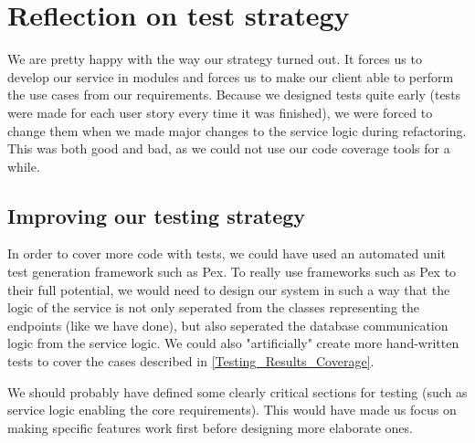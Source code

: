 \section{Reflection on test strategy}
\label{Testing_Reflection}
We are pretty happy with the way our strategy turned out. It forces us to develop our service in modules and forces us to make our client able to perform the use cases from our requirements. Because we designed tests quite early (tests were made for each user story every time it was finished), we were forced to change them when we made major changes to the service logic during refactoring. This was both good and bad, as we could not use our code coverage tools for a while.
\subsection{Improving our testing strategy}
\label{Testing_Reflection_improvements}
In order to cover more code with tests, we could have used an automated unit test generation framework such as Pex\cite{PEX}. To really use frameworks such as Pex to their full potential, we would need to design our system in such a way that the logic of the service is not only seperated from the classes representing the endpoints (like we have done), but also seperated the database communication logic from the service logic. We could also "artificially" create more hand-written tests to cover the cases described in \ref{Testing_Results_Coverage}.

We should probably have defined some clearly critical sections for testing (such as service logic enabling the core requirements). This would have made us focus on making specific features work first before designing more elaborate ones.